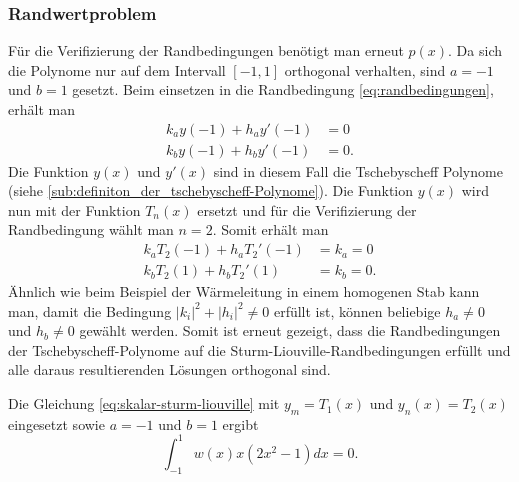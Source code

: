 \subsubsection*{Randwertproblem}
Für die Verifizierung der Randbedingungen benötigt man erneut $p(x)$.
Da sich die Polynome nur auf dem Intervall $[ -1,1 ]$ orthogonal verhalten,
sind $a = -1$ und $b = 1$ gesetzt.
Beim einsetzen in die Randbedingung \eqref{eq:randbedingungen}, erhält man
\begin{equation}
\begin{aligned}
	k_a y(-1) + h_a y'(-1) &= 0\\
	k_b y(-1) + h_b y'(-1) &= 0.
\end{aligned} 
\end{equation}
Die Funktion $y(x)$ und $y'(x)$ sind in diesem Fall die Tschebyscheff Polynome
(siehe \ref{sub:definiton_der_tschebyscheff-Polynome}).
Die Funktion $y(x)$ wird nun mit der Funktion $T_n(x)$ ersetzt und für die
Verifizierung der Randbedingung wählt man $n=2$.
Somit erhält man
\begin{equation}
	\begin{aligned}
	k_a T_2(-1) + h_a T_{2}'(-1) &= k_a = 0\\
	k_b T_2(1) + h_b T_{2}'(1) &= k_b = 0.
	\end{aligned}
\end{equation}
Ähnlich wie beim Beispiel der Wärmeleitung in einem homogenen Stab kann man,
damit die Bedingung $|k_i|^2 + |h_i|^2\ne 0$ erfüllt ist, können beliebige
$h_a \ne 0$ und $h_b \ne 0$ gewählt werden.
Somit ist erneut gezeigt, dass die Randbedingungen der Tschebyscheff-Polynome
auf die Sturm-Liouville-Randbedingungen erfüllt und alle daraus resultierenden
Lösungen orthogonal sind.

\begin{beispiel}
	Die Gleichung \eqref{eq:skalar-sturm-liouville} mit $y_m = T_1(x)$ und
	$y_n(x) = T_2(x)$ eingesetzt sowie $a=-1$ und $b = 1$ ergibt
	\[
	\int_{-1}^{1} w(x) x (2x^2-1) dx = 0.
	\]
\end{beispiel}
